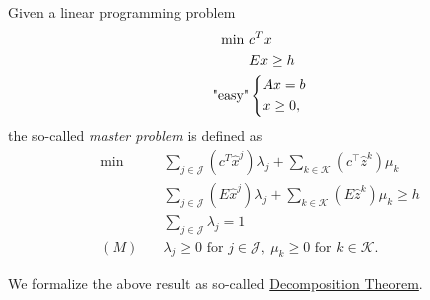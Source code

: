 \begin{definition}\label{def:master-problem}
	Given a linear programming problem
	\begin{align*}
		\min~         & c^Tx          \\
		              & Ex\geq h      \\
		\text{"easy"} & \begin{dcases}
			                Ax = b \\
			                x\geq 0,
		                \end{dcases}
	\end{align*}
	the so-called \emph{master problem} is defined as
	\begin{align*}
		\min~    & \sum\limits_{j\in\mathcal{J}}\left(c^T\hat{x}^j\right)\lambda_{j} + \sum\limits_{k\in\mathcal{K}}\left(c^{\top} \hat{z}^k  \right)\mu_k \\
		         & \sum\limits_{j\in\mathcal{J}}\left(E\hat{x}^j\right)\lambda_{j} + \sum\limits_{k\in\mathcal{K}}\left(E \hat{z}^k \right)\mu_k \geq h    \\
		         & \sum\limits_{j\in\mathcal{J}}\lambda_{j} = 1                                                                                            \\
		(M)\quad & \lambda_{j}\geq 0 \text{ for }j\in\mathcal{J},\ \mu_k\geq 0 \text{ for }k\in\mathcal{K}.
	\end{align*}
\end{definition}
We formalize the above result as so-called \hyperref[thm:decomposition-theorem]{Decomposition Theorem}.
